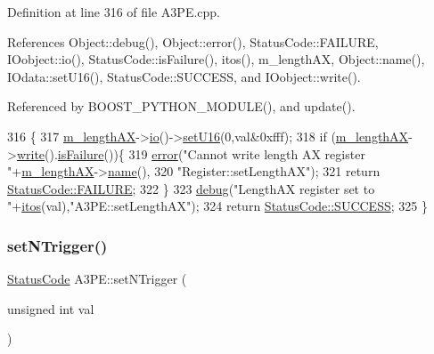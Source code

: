 Definition at line 316 of file A3\+P\+E.\+cpp.



References Object\+::debug(), Object\+::error(), Status\+Code\+::\+F\+A\+I\+L\+U\+RE, I\+Oobject\+::io(), Status\+Code\+::is\+Failure(), itos(), m\+\_\+length\+AX, Object\+::name(), I\+Odata\+::set\+U16(), Status\+Code\+::\+S\+U\+C\+C\+E\+SS, and I\+Oobject\+::write().



Referenced by B\+O\+O\+S\+T\+\_\+\+P\+Y\+T\+H\+O\+N\+\_\+\+M\+O\+D\+U\+L\+E(), and update().


\begin{DoxyCode}
316                                             \{
317   \hyperlink{classA3PE_a87c93a38343873f2d52741deca4750ce}{m\_lengthAX}->\hyperlink{classIOobject_af04fb94137c3d86849f478ac5afab5d1}{io}()->\hyperlink{classIOdata_aa9ade5ce3944c8e2b831533b6f876caf}{setU16}(0,val&0xfff);
318   \textcolor{keywordflow}{if} (\hyperlink{classA3PE_a87c93a38343873f2d52741deca4750ce}{m\_lengthAX}->\hyperlink{classIOobject_a9f6984bc9f0fadcf800f1be2523ac744}{write}().\hyperlink{classStatusCode_a5dd22dc6eb2c52fc4cabc58f6dea2eb7}{isFailure}())\{
319     \hyperlink{classObject_a204a95f57818c0f811933917a30eff45}{error}(\textcolor{stringliteral}{"Cannot write length AX register "}+\hyperlink{classA3PE_a87c93a38343873f2d52741deca4750ce}{m\_lengthAX}->\hyperlink{classObject_a300f4c05dd468c7bb8b3c968868443c1}{name}(),
320         \textcolor{stringliteral}{"Register::setLengthAX"});
321     \textcolor{keywordflow}{return} \hyperlink{classStatusCode_a6f565cbeadc76d14c72f047e5e85eb4ba3da73d4c469762eb9d3c960368252b26}{StatusCode::FAILURE};
322   \}
323   \hyperlink{classObject_aac010553f022165573714b7014a15f0d}{debug}(\textcolor{stringliteral}{"LengthAX register set to "}+\hyperlink{Tools_8h_af330027dbdafb9a30768b3613c553e60}{itos}(val),\textcolor{stringliteral}{"A3PE::setLengthAX"});
324   \textcolor{keywordflow}{return} \hyperlink{classStatusCode_a6f565cbeadc76d14c72f047e5e85eb4badd0da38d3ba0d922efd1f4619bc37ad8}{StatusCode::SUCCESS};
325 \}
\end{DoxyCode}
\mbox{\label{classA3PE_a81db44ddfc42b67ed08756b113b8e122}} 
\subsubsection{\texorpdfstring{set\+N\+Trigger()}{setNTrigger()}}
{\footnotesize\ttfamily \hyperlink{classStatusCode}{Status\+Code} A3\+P\+E\+::set\+N\+Trigger (\begin{DoxyParamCaption}\item[{unsigned int}]{val }\end{DoxyParamCaption})}



